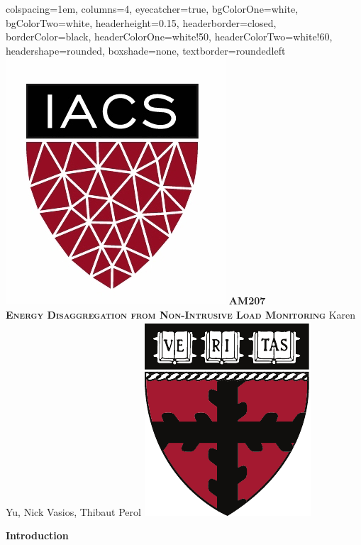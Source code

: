 \documentclass[landscape,fontscale=0.48,margin=2cm,paperwidth=135truecm,paperheight=89truecm]{baposter}
\begin{document}
\begin{poster}{
		colspacing=1em,
		columns=4,
        eyecatcher=true,
		bgColorOne=white,
		bgColorTwo=white,
		headerheight=0.15\textheight,
		headerborder=closed,
		borderColor=black,
		headerColorOne=white!50,
		headerColorTwo=white!60,
		headershape=rounded,
		boxshade=none,
		textborder=roundedleft
}
{\hspace{2em}\includegraphics[scale=0.35]{IACS}}
{\bfseries AM207\\[12pt] \textsc{Energy Disaggregation from Non-Intrusive Load Monitoring}}
{\vspace{1em}Karen Yu, Nick Vasios, Thibaut Perol}
{\hspace{-2em}\includegraphics[scale=0.8]{SEAS_S}}


\vspace{2em}


%
\begin{posterbox}[column=0]{\LARGE \bfseries Introduction}

\end{posterbox}
\end{poster}
\end{document}
